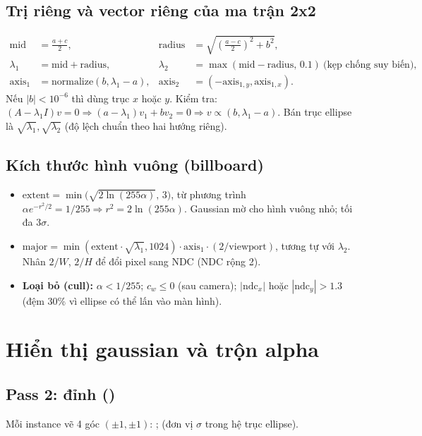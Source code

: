 \subsection{Trị riêng và vector riêng của ma trận 2x2}
\begin{align*}
\mathrm{mid}&=\tfrac{a+c}{2}, & \mathrm{radius}&=\sqrt{\left(\tfrac{a-c}{2}\right)^2+b^2},\\
\lambda_1&=\mathrm{mid}+\mathrm{radius}, & \lambda_2&=\max(\mathrm{mid}-\mathrm{radius},\,0.1)\ \text{(kẹp chống suy biến)},\\
\mathrm{axis}_1&=\mathrm{normalize}(b,\lambda_1-a), & \mathrm{axis}_2&=(-\mathrm{axis}_{1,y},\mathrm{axis}_{1,x}).
\end{align*}
Nếu $|b|<10^{-6}$ thì dùng trục $x$ hoặc $y$. Kiểm tra: $(A-\lambda_1 I)v=0\Rightarrow(a-\lambda_1)v_1+bv_2=0\Rightarrow v\propto(b,\lambda_1-a)$. Bán trục ellipse là $\sqrt{\lambda_1},\sqrt{\lambda_2}$ (độ lệch chuẩn theo hai hướng riêng).

\subsection{Kích thước hình vuông (billboard)}
\begin{itemize}
\item $\mathrm{extent}=\min\!\big(\sqrt{2\ln(255\alpha)},\,3\big)$, từ phương trình $\alpha e^{-r^2/2}=1/255\Rightarrow r^2=2\ln(255\alpha)$. Gaussian mờ cho hình vuông nhỏ; tối đa $3\sigma$.
\item $\mathrm{major}=\min(\mathrm{extent}\cdot\sqrt{\lambda_1},1024)\cdot\mathrm{axis}_1\cdot(2/\mathrm{viewport})$,  tương tự với $\lambda_2$. Nhân $2/W$, $2/H$ để đổi pixel sang NDC (NDC rộng 2).
\item \textbf{Loại bỏ (cull):} $\alpha<1/255$; $c_w\le0$ (sau camera); $|\mathrm{ndc}_x|$ hoặc $|\mathrm{ndc}_y|>1.3$ (đệm 30\% vì ellipse có thể lấn vào màn hình).
\end{itemize}

\section{Hiển thị gaussian và trộn alpha}\label{s:blend}
\subsection{Pass 2: đỉnh ()}
Mỗi instance vẽ 4 góc $(\pm1,\pm1)$: ;  (đơn vị $\sigma$ trong hệ trục ellipse).

